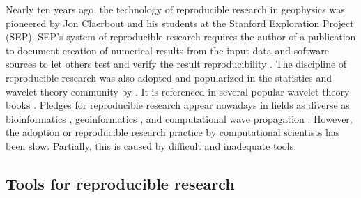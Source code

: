 \begin{comment}
The quest for peer review and reproducibility is especially important
for computational geosciences and computational geophysics in
particular. The very first paper published in \emph{Geophysics} was
titled ``Black magic in geophysical prospecting''
\cite[]{GEO01-01-00010008,TLE02-03-00280031} and presented an account
of different ``magical'' methods of oil explorations promoted by
entrepreneurs in the early days of geophysical exploration industry.
Although none of these methods exist today, it is not a secret that
industrial practice is full of nearly magical tricks, often hidden
besides a scientific appearance. Only a scrutiny of peer review and
result verification can help us distinguish magic from science and
advance the latter.
\end{comment}

Nearly ten years ago, the technology of reproducible research in
geophysics was pioneered by Jon Claerbout and his students at the
Stanford Exploration Project (SEP).  SEP's system of reproducible
research requires the author of a publication to document creation of
numerical results from the input data and software sources to let
others test and verify the result reproducibility
\cite[]{SEG-1992-0601,matt}.
The discipline of reproducible research was also adopted and
popularized in the statistics and wavelet theory community by
\cite{donoho}. It is referenced in several popular wavelet theory
books \cite[]{hubbard,mallat}. Pledges for reproducible research
appear nowadays in fields as diverse as bioinformatics
\cite[]{bioconductor}, 
geoinformatics \cite[]{geo}, and computational
wave propagation \cite[]{randy}. However, the adoption or reproducible
research practice by computational scientists has been slow.
Partially, this is caused by difficult and inadequate tools.

\subsection{Tools for reproducible research}

